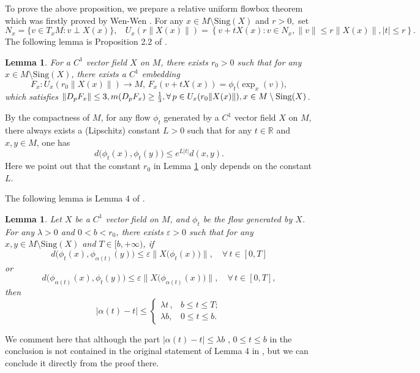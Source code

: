 \documentclass[10pt]{article}
\newtheorem*{Theorem A}{Theorem A}
\newtheorem{Lemma}[Theorem]{Lemma}
\newcommand{\Sing}{\text{Sing}}
\begin{document}
To prove the above proposition, we prepare a relative uniform flowbox theorem which was firstly proved by Wen-Wen \cite{wen2019rescaled}. For any \(x\in M\setminus \Sing(X)\) and \(r>0,\) set
\[
N_x = \{ v \in T_x M : v \perp X(x) \},\ \ \ \
U_x(r \| X(x) \|) = \left\{ v + t X(x) : v \in N_x,\| v \| \leq r \| X(x) \|, |t|\leq r  \right\}.
\]
The following lemma is Proposition 2.2 of \cite{wen2019rescaled}.
\begin{Lemma}\label{flowbox}
For a \( C^1 \) vector field \( X \) on \( M \), there exists \( r_0 > 0 \) such that for any \( x \in M \setminus \text{Sing}(X) \), there exists a \( C^1 \) embedding
\[
F_x: U_x(r_0\| X(x) \|) \to M ,\,F_x(v + t X(x)) = \phi_t\bigl(\exp_x(v)\bigr),
\]
which satisfies
 \(\| D_pF_x \| \leq 3, m(D_pF_x) \geq \frac{1}{3}, \forall\, p \in U_x(r_0\| X(x) \|), x\in M\setminus{\rm Sing}(X)\).
\end{Lemma}




By the compactness of $M$,  for any flow $\phi_t$ generated by a \(C^1\)  vector field $X$ on  $M$, there always exists a (Lipschitz) constant $L > 0$ such that for any  \( t \in \mathbb{R} \) and \( x, y \in M \), one has
\[
d\bigl(\phi_t(x), \phi_t(y)\bigr) \leq e^{L |t|} d(x, y).
\]
Here we point out that the constant \( r_0 \) in Lemma \ref{flowbox} only depends on the constant \( L \).


The following lemma is Lemma 4 of \cite{WANG2024128673}.
\begin{Lemma}\label{controloftimereparametrization}
Let \( X \) be a \( C^1 \) vector field on \( M \), and \( \phi_t \) be the flow generated by \( X \). For any \( \lambda > 0 \) and \( 0 < b < r_0 \), there exists \( \varepsilon > 0 \) such that for any \( x, y \in M \setminus \text{Sing}(X) \) and \( T \in [b, +\infty) \), if
\[
d\bigl(\phi_t(x), \phi_{\alpha(t)}(y)\bigr) \leq \varepsilon \| X\bigl(\phi_t(x)\bigr) \|,\quad \forall\, t \in [0, T]
\]
or
\[
d\bigl(\phi_{\alpha(t)}(x), \phi_t(y)\bigr) \leq \varepsilon \| X\bigl(\phi_{\alpha(t)}(x)\bigr) \|,\quad \forall\, t \in [0, T],
\]
then
\[
|\alpha(t) - t| \leq \begin{cases}
\lambda t \, , & b \leq t \leq T; \\
\lambda b,  & 0 \leq t \leq b.
\end{cases}
\]
\end{Lemma}
\noindent

We comment here that although the part \( |\alpha(t) - t| \leq \lambda b \) , \( 0 \leq t \leq b \) in the conclusion is not contained in the original statement of Lemma 4 in \cite{WANG2024128673}, but we can conclude it directly from the proof there.
\end{document}
